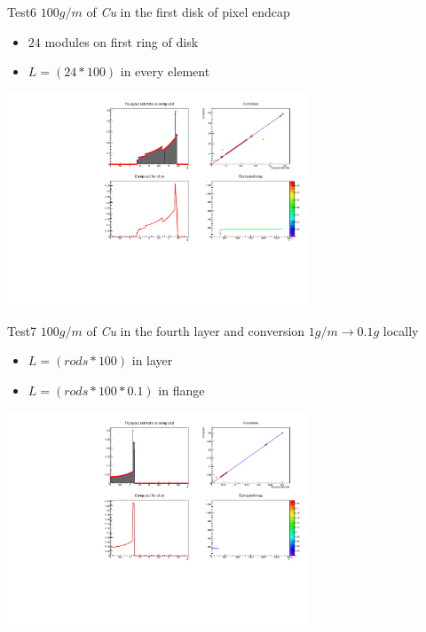 \documentclass[pdftex, 11pt]{beamer}
\begin{document}
\begin{frame}
  \begin{block}{Test6}
    \alert{$100 g/m$} of \emph{Cu} in the first disk of pixel endcap
    \begin{itemize}
    \item \alert{$24$} modules on first ring of disk
    \item \alert{$L=(24*100)$} in every element
    \end{itemize}
  \end{block}
  \begin{center}
    \includegraphics[width=9cm]{img/test6.pdf}
  \end{center}
\end{frame}

\begin{frame}
  \begin{block}{Test7}
    \alert{$100 g/m$} of \emph{Cu} in the fourth layer and conversion \alert{$1g/m\to 0.1g$ locally}
    \begin{itemize}
    \item \alert{$L=(rods*100)$} in layer
    \item \alert{$L=(rods*100*0.1)$} in flange
    \end{itemize}
  \end{block}
  \begin{center}
    \includegraphics[width=9cm]{img/test7.pdf}
  \end{center}
\end{frame}
\end{document}
